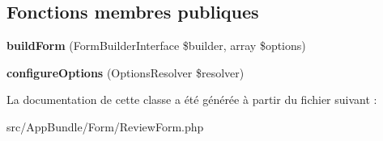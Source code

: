 \subsection*{Fonctions membres publiques}
\begin{DoxyCompactItemize}
\item 
\mbox{\label{classAppBundle_1_1Form_1_1ReviewForm_a60e8dbe014408ee6d865b52e4b4db4e3}} 
{\bfseries build\+Form} (Form\+Builder\+Interface \$builder, array \$options)
\item 
\mbox{\label{classAppBundle_1_1Form_1_1ReviewForm_ab654af85b04d25657af117f69435fa59}} 
{\bfseries configure\+Options} (Options\+Resolver \$resolver)
\end{DoxyCompactItemize}


La documentation de cette classe a été générée à partir du fichier suivant \+:\begin{DoxyCompactItemize}
\item 
src/\+App\+Bundle/\+Form/Review\+Form.\+php\end{DoxyCompactItemize}
